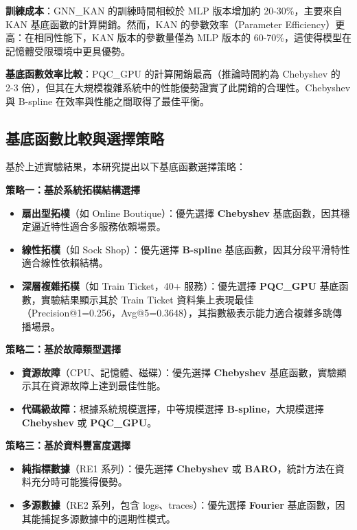 \documentclass[10pt,a4paper,twocolumn]{article}
\begin{document}
\textbf{訓練成本}：GNN\_KAN 的訓練時間相較於 MLP 版本增加約 20-30\%，主要來自 KAN 基底函數的計算開銷。然而，KAN 的參數效率（Parameter Efficiency）更高：在相同性能下，KAN 版本的參數量僅為 MLP 版本的 60-70\%，這使得模型在記憶體受限環境中更具優勢。

\textbf{基底函數效率比較}：PQC\_GPU 的計算開銷最高（推論時間約為 Chebyshev 的 2-3 倍），但其在大規模複雜系統中的性能優勢證實了此開銷的合理性。Chebyshev 與 B-spline 在效率與性能之間取得了最佳平衡。

\subsection{基底函數比較與選擇策略}

基於上述實驗結果，本研究提出以下基底函數選擇策略：

\textbf{策略一：基於系統拓樸結構選擇}
\begin{itemize}
\item \textbf{扇出型拓樸}（如 Online Boutique）：優先選擇 \textbf{Chebyshev} 基底函數，因其穩定逼近特性適合多服務依賴場景。
\item \textbf{線性拓樸}（如 Sock Shop）：優先選擇 \textbf{B-spline} 基底函數，因其分段平滑特性適合線性依賴結構。
\item \textbf{深層複雜拓樸}（如 Train Ticket，40+ 服務）：優先選擇 \textbf{PQC\_GPU} 基底函數，實驗結果顯示其於 Train Ticket 資料集上表現最佳（Precision@1=0.256，Avg@5=0.3648），其指數級表示能力適合複雜多跳傳播場景。
\end{itemize}

\textbf{策略二：基於故障類型選擇}
\begin{itemize}
\item \textbf{資源故障}（CPU、記憶體、磁碟）：優先選擇 \textbf{Chebyshev} 基底函數，實驗顯示其在資源故障上達到最佳性能。
\item \textbf{代碼級故障}：根據系統規模選擇，中等規模選擇 \textbf{B-spline}，大規模選擇 \textbf{Chebyshev} 或 \textbf{PQC\_GPU}。
\end{itemize}

\textbf{策略三：基於資料豐富度選擇}
\begin{itemize}
\item \textbf{純指標數據}（RE1 系列）：優先選擇 \textbf{Chebyshev} 或 \textbf{BARO}，統計方法在資料充分時可能獲得優勢。
\item \textbf{多源數據}（RE2 系列，包含 logs、traces）：優先選擇 \textbf{Fourier} 基底函數，因其能捕捉多源數據中的週期性模式。
\end{itemize}
\end{document}
